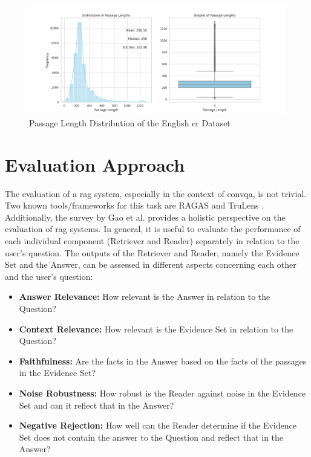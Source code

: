 \begin{figure}[H]
    \centering
    \includegraphics[width=\textwidth]{Grafiken/Statistiken/IndexEnglish_Passage_Length_Statistics.png}
    \caption{Passage Length Distribution of the English \gls{er} Dataset}
    \label{fig:er-english-passage-length}
\end{figure}


\section{Evaluation Approach}
\label{sec:metrics}

The evaluation of a \gls{rag} system, especially in the context of \gls{convqa}, is not trivial. Two known tools/frameworks for this task are RAGAS \cite{noauthor_ragas} and TruLens \cite{noauthor_truelens}. Additionally, the survey by Gao et al. \cite{gao_retrieval-augmented_2024} provides a holistic perspective on the evaluation of \gls{rag} systems. In general, it is useful to evaluate the performance of each individual component (Retriever and Reader) separately in relation to the user's question. The outputs of the Retriever and Reader, namely the Evidence Set and the Answer, can be assessed in different aspects concerning each other and the user's question:

\begin{itemize}
    \item \textbf{Answer Relevance:} How relevant is the Answer in relation to the Question?
    \item \textbf{Context Relevance:} How relevant is the Evidence Set in relation to the Question?
    \item \textbf{Faithfulness:} Are the facts in the Answer based on the facts of the passages in the Evidence Set?
    \item \textbf{Noise Robustness:} How robust is the Reader against noise in the Evidence Set and can it reflect that in the Answer?
    \item \textbf{Negative Rejection:} How well can the Reader determine if the Evidence Set does not contain the answer to the Question and reflect that in the Answer?
\end{itemize}

